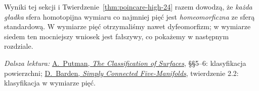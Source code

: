 Wyniki tej sekcji i
Twierdzenie~\ref{thm:poincare-high-24}
razem dowodzą, że \emph{każda
gładka} sfera homotopijna wymiaru
co najmniej pięć jest
\emph{homeomorficzna} ze sferą
standardową. W wymiarze pięć
otrzymaliśmy nawet dyfeomorfizm;
w wymiarze siedem ten mocniejszy
wniosek jest fałszywy, co pokażemy
w następnym rozdziale.

\par\smallskip
{\footnotesize\noindent\emph{Dalsza lektura:}
\href{https://academicweb.nd.edu/~andyp/notes/ClassificationSurfacesLong.pdf}
{A.\ Putman, \emph{The Classification of Surfaces}},
§§5--6: klasyfikacja powierzchni;
\href{https://www.sas.rochester.edu/mth/sites/doug-ravenel/otherpapers/barden.pdf}
{D.\ Barden, \emph{Simply Connected Five-Manifolds}},
twierdzenie 2.2: klasyfikacja w wymiarze pięć.\par}

\clearpage
